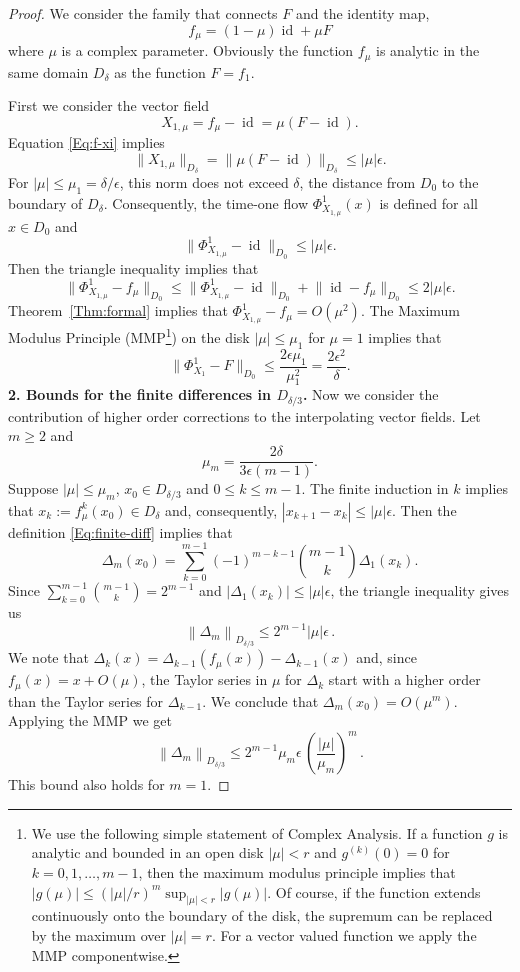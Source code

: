 \documentclass[a4paper,12pt]{article}
\begin{document}
\begin{proof}
We consider the family that connects $F$ and the identity map,
\[
f_\mu=(1-\mu)\operatorname{id} +\mu F
\]
where $\mu$ is a complex parameter.  
Obviously the  function $f_\mu$ is analytic in the same domain $D_\delta$ as the function $F=f_1$.

 First we consider the
 vector field 
\[
X_{1,\mu}=f_\mu -\operatorname{id} =\mu(F-\operatorname{id} ).
\] 
Equation \eqref{Eq:f-xi} implies
\[\|X_{1,\mu}\|_{D_{\delta}}=\|\mu(F-\operatorname{id} )\|_{D_{\delta}}\le |\mu|\epsilon.
\]
For $|\mu|\le\mu_1=\delta/\epsilon$, this norm does not exceed $\delta$, the distance from
$D_0$ to the boundary of $D_\delta$. Consequently,
the time-one flow $\Phi^1_{X_{1,\mu}}(x)$ is defined 
for all $x\in D_0$ and 
\[\bigl\|\Phi^1_{X_{1,\mu}}-\operatorname{id} \bigr\|_{D_0}
\le |\mu|\epsilon.
\]
Then the triangle inequality implies that
\[
\bigl\|\Phi^1_{X_{1,\mu}}-f_\mu \bigr\|_{D_0}\le 
\bigl\|\Phi^1_{X_{1,\mu}}-\operatorname{id} \bigr\|_{D_0}+\bigl\|\operatorname{id} -f_\mu \bigr\|_{D_0}
\le 2 |\mu|\epsilon. \]
 Theorem~\ref{Thm:formal} implies that $\Phi^1_{X_{1,\mu}}-f_\mu=O(\mu^2)$. The Maximum Modulus Principle (MMP\footnote{We  use the following simple statement of Complex Analysis.
 If a function $g$ is analytic and bounded in an open disk   $|\mu|<r$ and $g^{(k)}(0)=0$ for $k=0,1,\ldots,m-1$,
 then  the maximum modulus principle implies that 
 $|g(\mu )|\le \left(|\mu|/r\right)^{m} \sup_{|\mu|< r} |g(\mu )|$.
 Of course, if the function  extends continuously onto the boundary of the disk,
 the supremum can be replaced by the maximum over $|\mu|=r$. For a vector valued function
 we apply the MMP componentwise.})
 on the disk $|\mu|\le\mu_1$ for $\mu=1$ implies that
\[
\bigl\|\Phi^1_{X_{1}}-F \bigr\|_{D_0}  
\le   \frac{ 2\epsilon\mu_1}{\mu_1^{2}}
=
 \frac{2\epsilon^2 }{\delta}.
\]
{\bf 2. Bounds for the finite differences in $D_{\delta/3}$.}
Now we consider the contribution of higher order corrections to the interpolating
vector fields.
Let $m\ge 2$ and
\[
\mu_m=\frac{2\delta}{3\epsilon (m-1)}.
\]
Suppose $|\mu|\le \mu_m$, $x_0\in D_{\delta/3}$ and $0\le k\le m-1$.
The finite induction in $k$ implies that $x_k:=f_\mu^k(x_0)\in D_{\delta}$ 
and, consequently, $|x_{k+1}-x_k|\le |\mu|\epsilon $. 
Then the definition \eqref{Eq:finite-diff}
implies that 
\[
    \Delta_{m}(x_0)=\sum_{k=0}^{m-1} (-1)^{m-k-1} \binom{m-1}{k}\Delta_1(x_k).
\]
Since $\sum_{k=0}^{m-1}\binom{m-1}{k}=2^{m-1}$ and $|\Delta_1(x_k)|\le |\mu|\epsilon$, the triangle inequality gives us
\[
	\left\| \Delta_{m}\right\|_{D_{\delta/3}}
	\le  
	2^{m-1}|\mu|\epsilon\,.
\]
We note that  $\Delta_k(x)=\Delta_{k-1}(f_\mu(x))-\Delta_{k-1}(x)$
and, since $f_\mu(x)=x+O(\mu)$, the Taylor series in $\mu$ for $\Delta_k$ start
with a higher order than the Taylor series for $\Delta_{k-1}$.
We conclude that   $\Delta_{m}(x_0)=O(\mu^{m})$.
Applying the MMP we get 
\[
\left\|\Delta_{m}\right\|_{D_{\delta/3}}
\le
2^{m-1}\mu_{m}\epsilon \,
\left(\frac{|\mu|}{\mu_{m}}\right)^{m} \,. 
\]
This bound also holds for $m=1$.


\end{proof}
\end{document}
